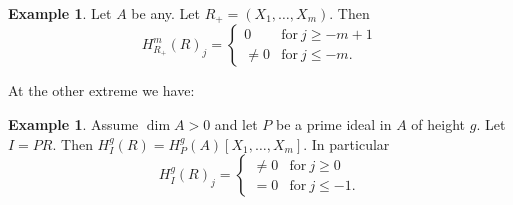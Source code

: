 \documentclass{amsart}
\theoremstyle{plain}
\theoremstyle{definition}
\newtheorem{example}[theorem]{Example}
\theoremstyle{remark}
\begin{document}
\begin{example}\label{ex-1}
Let $A$ be any. Let $R_+ = (X_1,\ldots, X_m)$. Then 
\[
 H^m_{R_+}(R)_j = \begin{cases}
 0 & \text{for} \ j \geq -m + 1 \\
 \neq 0  & \text{for} \ j \leq -m.
\end{cases}
\]
\end{example}
At the other extreme we have:
\begin{example}\label{ex-2.1}
Assume $\dim A > 0$ and let $P$ be a prime ideal in $A$ of height $g$. Let 
$I = P R$. Then $H^g_{I}(R) = H^g_P(A)[X_1,\ldots, X_m]$.
In particular
\[
 H^g_I(R)_j = \begin{cases}
 \neq 0 & \text{for} \ j \geq 0\\
 = 0  & \text{for} \ j \leq -1.
\end{cases}
\]
\end{example}
\end{document}
